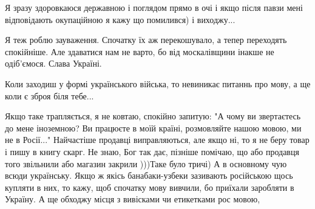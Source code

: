 \begin{itemize}
 
Я зразу здоровкаюся державною і поглядом прямо в очі і якщо після павзи мені
відповідають окупаційною я кажу що помилився) і виходжу...

 
Я теж роблю зауваження.
Спочатку їх аж перекошувало, а тепер переходять спокійніше.
Але здаватися нам не варто, бо від москалівщини інакше не одіб'ємося.
Слава Україні.

 
Коли заходиш у формі українського війська, то невиникає питаннь про мову, а ще коли є зброя біля тебе...

 

Якщо таке трапляється, я не ковтаю, спокійно запитую: "А чому ви звертаєтесь до
мене іноземною? Ви працюєте в моїй країні, розмовляйте нашою мовою, ми не в
Росії..." Найчастіше продавці виправляються, але якщо ні, то я не беру товар і
пишу в книгу скарг. Не знаю, Бог так дає, пізніше помічаю, що або продавця того
звільнили або магазин закрили )))Таке було тричі) А в основному чую всюди
українську. Якщо ж якісь банабаки-узбеки зазивають російською щось купляти в
них, то кажу, щоб спочатку мову вивчили, бо приїхали заробляти в Україну. А ще
обходжу місця з вивісками чи етикетками рос мовою,

 


\end{itemize}
